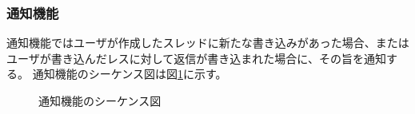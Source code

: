 \documentclass[a4j]{jarticle}
\begin{document}
  \subsubsection{通知機能}
  通知機能ではユーザが作成したスレッドに新たな書き込みがあった場合、またはユーザが書き込んだレスに対して返信が書き込まれた場合に、その旨を通知する。
  通知機能のシーケンス図は図\ref{fig:bbs_notice.png}に示す。
  \begin{figure}[H]
    \centering
    \caption{通知機能のシーケンス図}
    \label{fig:bbs_notice.png}
  \end{figure}
\end{document}

